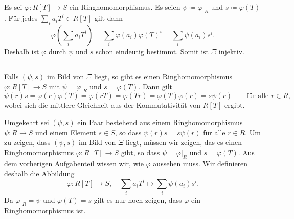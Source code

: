 \documentclass[a4paper, 10pt, numbers=noenddot]{scrartcl}
\begin{document}
\subsection{}

Es sei $\varphi \colon R[T] \to S$ ein Ringhomomorphismus.
Es seien $\psi \coloneqq \varphi|_R$ und $s \coloneqq \varphi(T)$.
Für jedes $\sum_i a_i T^i \in R[T]$ gilt dann
\[
    \varphi\left( \sum_i a_i T^i \right)
  = \sum_i \varphi(a_i) \varphi(T)^i
  = \sum_i \psi(a_i) s^i.
\]
Deshalb ist $\varphi$ durch $\psi$ und $s$ schon eindeutig bestimmt.
Somit ist $\Xi$ injektiv.





\subsection{}

Falls $(\psi, s)$ im Bild von $\Xi$ liegt, so gibt es einen Ringhomomorphismus $\varphi \colon R[T] \to S$ mit $\psi = \varphi|_R$ und $s = \varphi(T)$.
Dann gilt
\[
    \psi(r) s
  = \varphi(r) \varphi(T)
  = \varphi(r T)
  = \varphi(T r)
  = \varphi(T) \varphi(r)
  = s \psi(r)
  \qquad
  \text{für alle $r \in R$},
\]
wobei sich die mittlere Gleichheit aus der Kommutativität von $R[T]$ ergibt.

Umgekehrt sei $(\psi, s)$ ein Paar bestehend aus einem Ringhomomorphismus $\psi \colon R \to S$ und einem Element $s \in S$, so dass $\psi(r) s = s \psi(r)$ für alle $r \in R$.
Um zu zeigen, dass $(\psi, s)$ im Bild von $\Xi$ liegt, müssen wir zeigen, das es einen Ringhomomorphismus $\varphi \colon R[T] \to S$ gibt, so dass $\psi = \varphi|_R$ und $s = \varphi(T)$.
Aus dem vorherigen Aufgabenteil wissen wir, wie $\varphi$ aussehen muss.
Wir definieren deshalb die Abbildung
\[
  \varphi \colon R[T] \to S,
  \quad
  \sum_i a_i T^i \mapsto \sum_i \psi(a_i) s^i.
\]
Da $\varphi|_R = \psi$ und $\varphi(T) = s$ gilt es nur noch zeigen, dass $\varphi$ ein Ringhomomorphismus ist.
\end{document}
